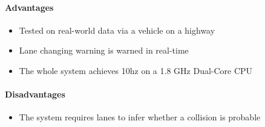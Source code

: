 \documentclass[a4paper]{report}
\begin{document}
\paragraph{Advantages}
\begin{itemize}
\item Tested on real-world data via a vehicle on a highway
\item Lane changing warning is warned in real-time
\item The whole system achieves 10hz on a 1.8 GHz Dual-Core CPU
\end{itemize}

\paragraph{Disadvantages}
\begin{itemize}
\item The system requires lanes to infer whether a collision is probable	 	
\end{itemize}
\end{document}
